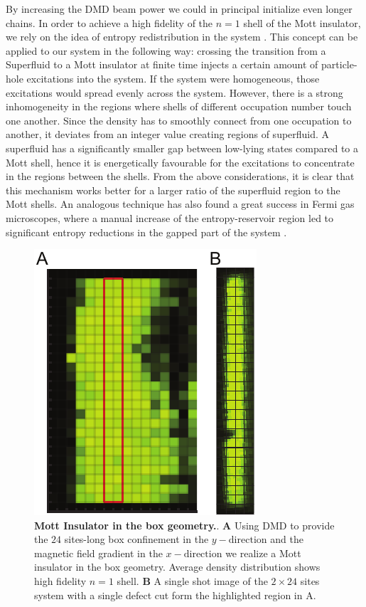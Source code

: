 By increasing the DMD beam power we could in principal initialize even longer chains. In order to achieve a high fidelity of the $n=1$ shell of the Mott insulator, we rely on the idea of entropy redistribution in the system \cite{some entropy redistribution}. This concept can be applied to our system in the following way: crossing the transition from a Superfluid to a Mott insulator at finite time injects a certain amount of particle-hole excitations into the system. If the system were homogeneous, those excitations would spread evenly across the system. However, there is a strong inhomogeneity in the regions where shells of different occupation number touch one another. Since the density has to smoothly connect from one occupation to another, it deviates from an integer value creating regions of superfluid. A superfluid has a significantly smaller gap between low-lying states compared to a Mott shell, hence it is energetically favourable for the excitations to concentrate in the regions between the shells. From the above considerations, it is clear that this mechanism works better for a larger ratio of the superfluid region to the Mott shells. An analogous technique has also found a great success in Fermi gas microscopes, where a manual increase of the entropy-reservoir region led to significant entropy reductions in the gapped part of the system \cite{Mazurenko2017, Chiu2018}.

\begin{figure}[t]
	\centering
	\includegraphics[scale=1]{figures/CTE_MI_box.pdf}
	\caption{{\bf Mott Insulator in the box geometry.}. {\bf A} Using DMD to provide the $24$ sites-long box confinement in the $y-\mathrm{direction}$ and the magnetic field gradient in the $x-\mathrm{direction}$ we realize a Mott insulator in the box geometry. Average density distribution shows high fidelity $n=1$ shell.  {\bf B} A single shot image of the $2\times24$ sites system with a single defect cut form the highlighted region in A.}
	\label{fig:CTE_MI_box}
\end{figure}


